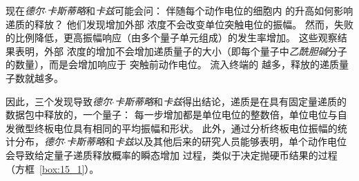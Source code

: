 现在\textit{德尔$\cdot$卡斯蒂略}和\textit{卡兹}可能会问：
伴随每个动作电位的细胞内  的升高如何影响递质的释放？
他们发现增加外部  浓度不会改变单位突触电位的振幅。
然而，失败的比例降低，更高振幅响应（由多个量子单元组成）的发生率增加。
这些观察结果表明，外部  浓度的增加不会增加递质量子的大小（即每个量子中\textit{乙酰胆碱}分子的数量），而是会增加响应于 突触前动作电位。
流入终端的  越多，释放的递质量子数就越多。


因此，三个发现导致\textit{德尔$\cdot$卡斯蒂略}和\textit{卡兹}得出结论，递质是在具有固定量递质的数据包中释放的，一个量子：
每一步增加都是单位电位的整数倍，单位电位与自发微型终板电位具有相同的平均振幅和形状。
此外，通过分析终板电位振幅的统计分布，\textit{德尔$\cdot$卡斯蒂略}和\textit{卡兹}以及其他后来的研究人员能够表明，单个动作电位会导致给定量子递质释放概率的瞬态增加 过程，类似于决定抛硬币结果的过程（方框~\ref{box:15_1}）。


